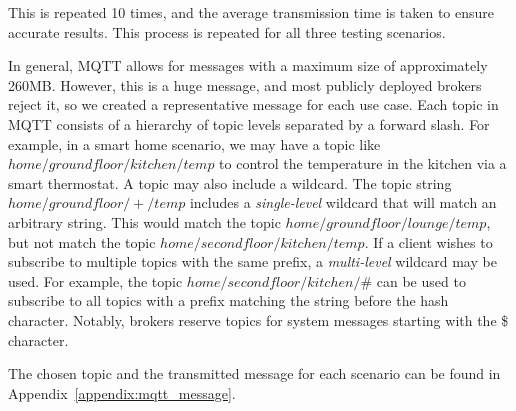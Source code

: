 This is repeated 10 times, and the average transmission time is taken to ensure accurate results.
This process is repeated for all three testing scenarios.

In general, MQTT allows for messages with a maximum size of approximately 260MB.
However, this is a huge message, and most publicly deployed brokers reject it, so we created a representative message for each use case.
Each topic in MQTT consists of a hierarchy of topic levels separated by a forward slash.
For example, in a smart home scenario, we may have a topic like $home/groundfloor/kitchen/temp$ to control the temperature in the kitchen via a smart thermostat.
A topic may also include a wildcard.
The topic string $home/groundfloor/+/temp$ includes a \textit{single-level} wildcard that will match an arbitrary string.
This would match the topic $home/groundfloor/lounge/temp$, but not match the topic $home/secondfloor/kitchen/temp$.
If a client wishes to subscribe to multiple topics with the same prefix, a \textit{multi-level} wildcard may be used.
For example, the topic $home/secondfloor/kitchen/\#$ can be used to subscribe to all topics with a prefix matching the string before the hash character.
Notably, brokers reserve topics for system messages starting with the \$ character.

The chosen topic and the transmitted message for each scenario can be found in Appendix~\ref{appendix:mqtt_message}.
